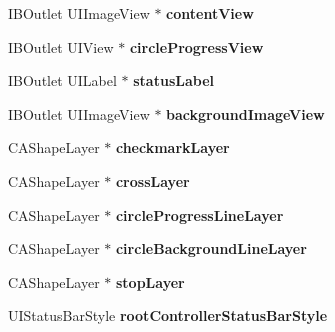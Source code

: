 \begin{DoxyCompactItemize}
\mbox{\label{category_k_v_n_progress_07_08_a7c161556d4c8b77fc4435b34d101805b}} 
I\+B\+Outlet U\+I\+Image\+View $\ast$ {\bfseries content\+View}
\item 
\mbox{\label{category_k_v_n_progress_07_08_a5c515642a0ad02a51b5a0ef3118dc73b}} 
I\+B\+Outlet U\+I\+View $\ast$ {\bfseries circle\+Progress\+View}
\item 
\mbox{\label{category_k_v_n_progress_07_08_a81eb48cd4b68c3693745105651c716f2}} 
I\+B\+Outlet U\+I\+Label $\ast$ {\bfseries status\+Label}
\item 
\mbox{\label{category_k_v_n_progress_07_08_a4f8e83a5c4ac630b29d4b960922f20e9}} 
I\+B\+Outlet U\+I\+Image\+View $\ast$ {\bfseries background\+Image\+View}
\item 
\mbox{\label{category_k_v_n_progress_07_08_abf56cc6986a8e7aad2eb9fedbfdc957d}} 
C\+A\+Shape\+Layer $\ast$ {\bfseries checkmark\+Layer}
\item 
\mbox{\label{category_k_v_n_progress_07_08_a4479f66c97695b3e1f6232410f15cc88}} 
C\+A\+Shape\+Layer $\ast$ {\bfseries cross\+Layer}
\item 
\mbox{\label{category_k_v_n_progress_07_08_ae1ca793d53ef2bc8432ad768e34c5708}} 
C\+A\+Shape\+Layer $\ast$ {\bfseries circle\+Progress\+Line\+Layer}
\item 
\mbox{\label{category_k_v_n_progress_07_08_ab6702bd518b991b79ffbeb8057e61a3f}} 
C\+A\+Shape\+Layer $\ast$ {\bfseries circle\+Background\+Line\+Layer}
\item 
\mbox{\label{category_k_v_n_progress_07_08_a956c930d5dbc443d26efe1218d766e6f}} 
C\+A\+Shape\+Layer $\ast$ {\bfseries stop\+Layer}
\item 
\mbox{\label{category_k_v_n_progress_07_08_ab5516977f1e094c1136a88f0e93424c4}} 
U\+I\+Status\+Bar\+Style {\bfseries root\+Controller\+Status\+Bar\+Style}

\end{DoxyCompactItemize}
